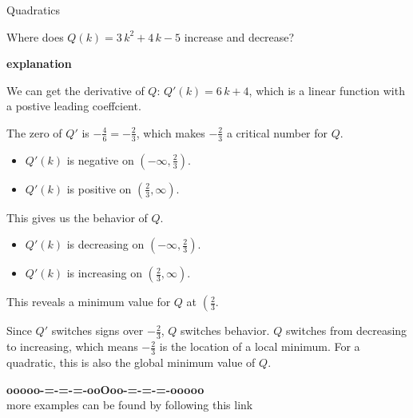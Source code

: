 \documentclass{ximera}
\begin{document}
\begin{example} Quadratics


Where does $Q(k) = 3 \, k^2 + 4 \, k -5$ increase and decrease?

\textbf{\textcolor{red!75!green}{explanation}} 


We can get the derivative of $Q$: $Q'(k) = 6 \, k + 4$, which is a linear function with a postive leading coeffcient.

The zero of $Q'$ is $-\frac{4}{6} = -\frac{2}{3}$, which makes $-\frac{2}{3}$ a critical number for $Q$.

\begin{itemize}
\item $Q'(k)$ is negative on $\left(-\infty, \frac{2}{3} \right)$. 
\item $Q'(k)$ is positive on $\left(\frac{2}{3}, \infty \right)$. 
\end{itemize}

This gives us the behavior of $Q$.

\begin{itemize}
\item $Q'(k)$ is decreasing on $\left(-\infty, \frac{2}{3} \right)$. 
\item $Q'(k)$ is increasing on $\left(\frac{2}{3}, \infty \right)$. 
\end{itemize}

This reveals a minimum value for $Q$ at $\left(\frac{2}{3}$.

Since $Q'$ switches signs over $-\frac{2}{3}$, $Q$ switches behavior. $Q$ switches from decreasing to increasing, which means $-\frac{2}{3}$ is the location of a local minimum.  For a quadratic, this is also the global minimum value of $Q$.


\end{example}

























\begin{center}
\textbf{\textcolor{green!50!black}{ooooo-=-=-=-ooOoo-=-=-=-ooooo}} \\

more examples can be found by following this link\\ 

\end{center}
\end{document}
